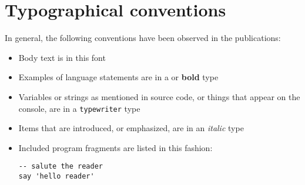 \chapter{Typographical conventions}
In general, the following conventions have  been observed in the \crexx{} publications:
\begin{itemize}
\item Body text is in this font
\item Examples of language statements are in a  or \textbf{bold} type
\item Variables or strings as mentioned in source code, or things that appear on the console, are in a \texttt{typewriter} type
\item Items that are introduced, or emphasized, are in an \emph{italic} type
\item Included program fragments are listed in this fashion:
\begin{lstlisting}[label=example,caption=Example Listing]
-- salute the reader
say 'hello reader'
\end{lstlisting}
\end{itemize}
